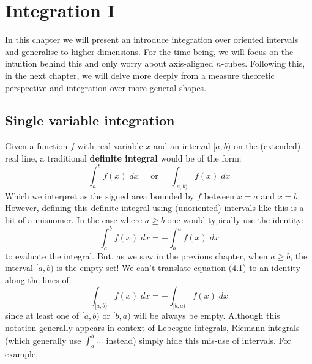 \chapter{Integration I}

In this chapter we will present an introduce integration over oriented intervals and generalise to higher dimensions.
For the time being, we will focus on the intuition behind this and only worry about axis-aligned $n$-cubes.
Following this, in the next chapter, we will delve more deeply from a measure theoretic perspective and integration over more general shapes.

%
%

\section{Single variable integration}

Given a function $f$ with real variable $x$ and an interval $[a,b)$ on the (extended) real line, 
a traditional \textbf{definite integral} would be of the form:
\begin{equation*}
	\int_a^b f(x) \; dx \;\;\;\;\; \text{or} \;\;\;\;\; \int_{[a,b)} f(x) \; dx
\end{equation*}
Which we interpret as the signed area bounded by $f$ between $x=a$ and $x=b$.
However, defining this definite integral using (unoriented) intervals like this is a bit of a misnomer.
In the case where $a \geq b$ one would typically use the identity:
\begin{equation}
	\int_a^b f(x) \; dx = - \int_b^a f(x) \; dx
\end{equation}
to evaluate the integral.
But, as we saw in the previous chapter, when $a \geq b$, the interval $[a,b)$ is the empty set!
We can't translate equation (4.1) to an identity along the lines of:
\begin{equation}
	\int_{[a,b)} f(x) \; dx = - \int_{[b,a)} f(x) \; dx
\end{equation}
since at least one of $[a,b)$ or $[b,a)$ will be always be empty.
Although this notation generally appears in context of Lebesgue integrals, 
Riemann integrals (which generally use $\int_a^b ...$ instead) simply hide this mis-use of intervals.
For example, 

